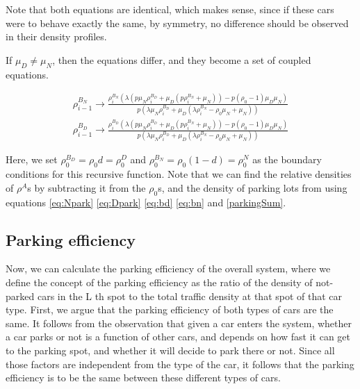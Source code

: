 \documentclass[]{article}
\begin{document}
Note that both equations are identical, which makes sense, since if these cars were to behave exactly the same, by symmetry, no difference should be observed in their density profiles.

If $\mu _D \not= \mu _N$, then the equations differ, and they become a set of coupled equations.

\begin{align}
\rho _{i-1}^{B_N}\to \frac{\rho _i^{B_N} \left(\lambda  \left(p \mu _N \rho _i^{B_D}+\mu _D \left(p \rho _i^{B_N}+\mu _N\right)\right)-p \left(\rho _0-1\right) \mu
	_D \mu _N\right)}{p \left(\lambda  \mu _N \rho _i^{B_D}+\mu _D \left(\lambda  \rho _i^{B_N}-\rho _0 \mu _N+\mu _N\right)\right)} \label{eq:bn}\\
\rho _{i-1}^{B_D}\to \frac{\rho _i^{B_D}
	\left(\lambda  \left(p \mu _N \rho _i^{B_D}+\mu _D \left(p \rho _i^{B_N}+\mu _N\right)\right)-p \left(\rho _0-1\right) \mu _D \mu _N\right)}{p \left(\lambda  \mu _N \rho
	_i^{B_D}+\mu _D \left(\lambda  \rho _i^{B_N}-\rho _0 \mu _N+\mu _N\right)\right)} \label{eq:bd}
\end{align}

Here, we set $\rho^{B_D}_0 = \rho_0 d = \rho_0^D$ and $\rho^{B_N}_0 = \rho_0 (1-d) = \rho_0^N$ as the boundary conditions for this recursive function. Note that we can find the relative densities of $\rho^A$s by subtracting it from the $\rho_0$s, and the density of parking lots from using equations \eqref{eq:Npark} \eqref{eq:Dpark} \eqref{eq:bd} \eqref{eq:bn} and \eqref{parkingSum}.

\subsection*{Parking efficiency}

Now, we can calculate the parking efficiency of the overall system, where we define the concept of the parking efficiency as the ratio of the density of not-parked cars in the L th spot to the total traffic density at that spot of that car type. First, we argue that the parking efficiency of both types of cars are the same. It follows from the observation that given a car enters the system, whether a car parks or not is a function of other cars, and depends on how fast it can get to the parking spot, and whether it will decide to park there or not. Since all those factors are independent from the type of the car, it follows that the parking efficiency is to be the same between these different types of cars. %
\end{document}
